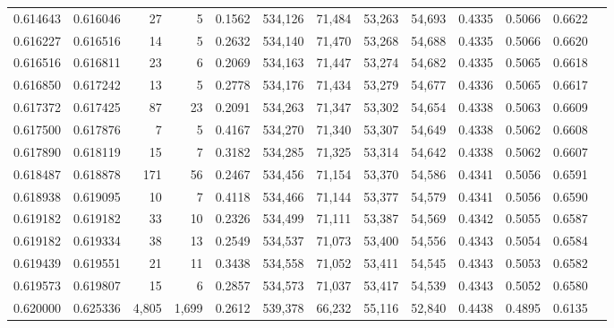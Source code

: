 \begin{tabular}{rrrrrrrrrrrrr}
0.614643 & 0.616046 &     27 &     5 &                                     0.1562 & 534,126 &  71,484 &  53,263 &  54,693 & 0.4335 & 0.5066 & 0.6622 \\
0.616227 & 0.616516 &     14 &     5 &                                     0.2632 & 534,140 &  71,470 &  53,268 &  54,688 & 0.4335 & 0.5066 & 0.6620 \\
0.616516 & 0.616811 &     23 &     6 &                                     0.2069 & 534,163 &  71,447 &  53,274 &  54,682 & 0.4335 & 0.5065 & 0.6618 \\
0.616850 & 0.617242 &     13 &     5 &                                     0.2778 & 534,176 &  71,434 &  53,279 &  54,677 & 0.4336 & 0.5065 & 0.6617 \\
0.617372 & 0.617425 &     87 &    23 &                                     0.2091 & 534,263 &  71,347 &  53,302 &  54,654 & 0.4338 & 0.5063 & 0.6609 \\
0.617500 & 0.617876 &      7 &     5 &                                     0.4167 & 534,270 &  71,340 &  53,307 &  54,649 & 0.4338 & 0.5062 & 0.6608 \\
0.617890 & 0.618119 &     15 &     7 &                                     0.3182 & 534,285 &  71,325 &  53,314 &  54,642 & 0.4338 & 0.5062 & 0.6607 \\
0.618487 & 0.618878 &    171 &    56 &                                     0.2467 & 534,456 &  71,154 &  53,370 &  54,586 & 0.4341 & 0.5056 & 0.6591 \\
0.618938 & 0.619095 &     10 &     7 &                                     0.4118 & 534,466 &  71,144 &  53,377 &  54,579 & 0.4341 & 0.5056 & 0.6590 \\
0.619182 & 0.619182 &     33 &    10 &                                     0.2326 & 534,499 &  71,111 &  53,387 &  54,569 & 0.4342 & 0.5055 & 0.6587 \\
0.619182 & 0.619334 &     38 &    13 &                                     0.2549 & 534,537 &  71,073 &  53,400 &  54,556 & 0.4343 & 0.5054 & 0.6584 \\
0.619439 & 0.619551 &     21 &    11 &                                     0.3438 & 534,558 &  71,052 &  53,411 &  54,545 & 0.4343 & 0.5053 & 0.6582 \\
0.619573 & 0.619807 &     15 &     6 &                                     0.2857 & 534,573 &  71,037 &  53,417 &  54,539 & 0.4343 & 0.5052 & 0.6580 \\
0.620000 & 0.625336 &  4,805 & 1,699 &                                     0.2612 & 539,378 &  66,232 &  55,116 &  52,840 & 0.4438 & 0.4895 & 0.6135 \\

\end{tabular}

